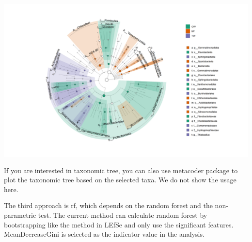 \documentclass[
]{book}
\newenvironment{Shaded}{\begin{snugshade}}{\end{snugshade}}
\newcommand{\AttributeTok}[1]{\textcolor[rgb]{0.77,0.63,0.00}{#1}}
\newcommand{\CommentTok}[1]{\textcolor[rgb]{0.56,0.35,0.01}{\textit{#1}}}
\newcommand{\ConstantTok}[1]{\textcolor[rgb]{0.00,0.00,0.00}{#1}}
\newcommand{\DecValTok}[1]{\textcolor[rgb]{0.00,0.00,0.81}{#1}}
\newcommand{\FunctionTok}[1]{\textcolor[rgb]{0.00,0.00,0.00}{#1}}
\newcommand{\NormalTok}[1]{#1}
\newcommand{\OtherTok}[1]{\textcolor[rgb]{0.56,0.35,0.01}{#1}}
\newcommand{\SpecialCharTok}[1]{\textcolor[rgb]{0.00,0.00,0.00}{#1}}
\newcommand{\StringTok}[1]{\textcolor[rgb]{0.31,0.60,0.02}{#1}}
\begin{document}
\begin{center}\includegraphics[width=1000px]{Images/plot_lefse_cladogram_1} \end{center}

If you are interested in taxonomic tree, you can also use metacoder package\citep{Foster_Metacoder_2017} to plot the taxonomic tree based on the selected taxa.
We do not show the usage here.

The third approach is rf, which depends on the random forest\citep{Beck_Machine_2014, Yatsunenko_Human_2012} and the non-parametric test.
The current method can calculate random forest by bootstrapping like the method in LEfSe and only use the significant features.
MeanDecreaseGini is selected as the indicator value in the analysis.

\begin{Shaded}
\end{Shaded}
\end{document}
